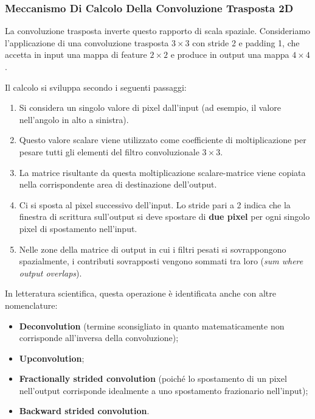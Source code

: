 ﻿\documentclass[11pt, a4paper]{article}
\begin{document}
\newpage

\subsubsection{Meccanismo Di Calcolo Della Convoluzione Trasposta 2D}

La convoluzione trasposta inverte questo rapporto di scala spaziale. Consideriamo l'applicazione di una convoluzione trasposta $3 \times 3$ con stride 2 e padding 1, che accetta in input una mappa di feature $2 \times 2$ e produce in output una mappa $4 \times 4$.


Il calcolo si sviluppa secondo i seguenti passaggi:
\begin{enumerate}[noitemsep]
    \item Si considera un singolo valore di pixel dall'input (ad esempio, il valore nell'angolo in alto a sinistra).
    \item Questo valore scalare viene utilizzato come coefficiente di moltiplicazione per pesare tutti gli elementi del filtro convoluzionale $3 \times 3$.
    \item La matrice risultante da questa moltiplicazione scalare-matrice viene copiata nella corrispondente area di destinazione dell'output.
    \item Ci si sposta al pixel successivo dell'input. Lo stride pari a 2 indica che la finestra di scrittura sull'output si deve spostare di \textbf{due pixel} per ogni singolo pixel di spostamento nell'input.
    \item Nelle zone della matrice di output in cui i filtri pesati si sovrappongono spazialmente, i contributi sovrapposti vengono sommati tra loro (\emph{sum where output overlaps}).
\end{enumerate}

In letteratura scientifica, questa operazione è identificata anche con altre nomenclature:
\begin{itemize}[noitemsep]
    \item \textbf{Deconvolution} (termine sconsigliato in quanto matematicamente non corrisponde all'inversa della convoluzione);
    \item \textbf{Upconvolution};
    \item \textbf{Fractionally strided convolution} (poiché lo spostamento di un pixel nell'output corrisponde idealmente a uno spostamento frazionario nell'input);
    \item \textbf{Backward strided convolution}.
\end{itemize}
\end{document}

